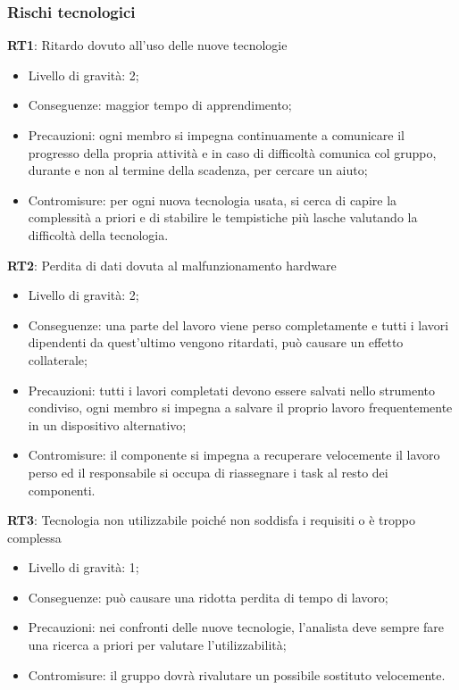 \subsubsection{Rischi tecnologici}
\textbf{RT1}:
 Ritardo dovuto all'uso delle nuove tecnologie
\begin{itemize}
\item Livello di gravità: 2;
\item Conseguenze: maggior tempo di apprendimento;
\item Precauzioni: ogni membro si impegna continuamente a comunicare il progresso della propria attività e in caso di difficoltà comunica col gruppo, durante e non al termine della scadenza, per cercare un aiuto;
\item Contromisure: per ogni nuova tecnologia usata, si cerca di capire la complessità a priori e di stabilire le tempistiche più lasche valutando la difficoltà della tecnologia.
\end{itemize}
\textbf{RT2}: 
Perdita di dati dovuta al malfunzionamento hardware
\begin{itemize}
\item Livello di gravità: 2;
\item Conseguenze: una parte del lavoro viene perso completamente e tutti i lavori dipendenti da quest'ultimo vengono ritardati, può causare un effetto collaterale;
\item Precauzioni: tutti i lavori completati devono essere salvati nello strumento condiviso, ogni membro si impegna a salvare il proprio lavoro frequentemente in un dispositivo alternativo;
\item Contromisure: il componente si impegna a recuperare velocemente il lavoro perso ed il responsabile si occupa di riassegnare i task al resto dei componenti.
\end{itemize}
\textbf{RT3}: 
Tecnologia non utilizzabile poiché non soddisfa i requisiti o è troppo complessa
\begin{itemize}
\item Livello di gravità: 1;
\item Conseguenze: può causare una ridotta perdita di tempo di lavoro;
\item Precauzioni: nei confronti delle nuove tecnologie, l'analista deve sempre fare una ricerca a priori per valutare l'utilizzabilità;
\item Contromisure: il gruppo dovrà rivalutare un possibile sostituto velocemente.
\end{itemize}

